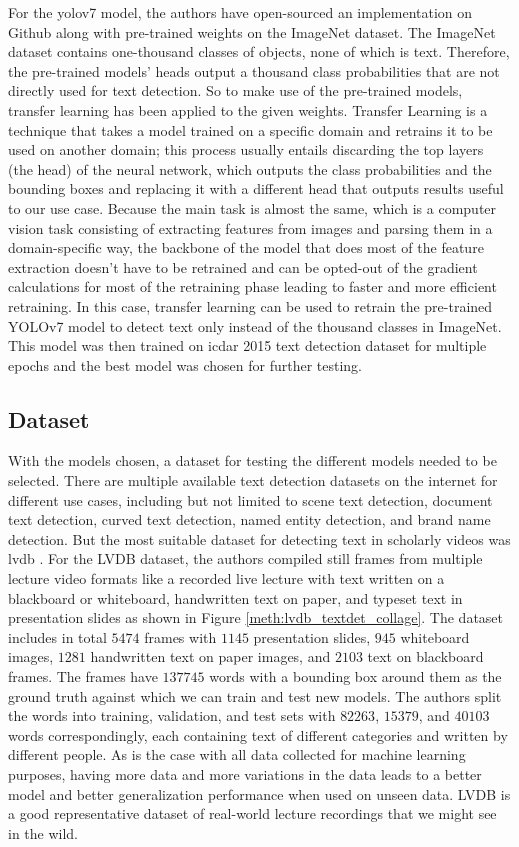 For the \gls{yolov7} model, the authors have open-sourced an implementation on Github\cite{wong_official_2023} along with pre-trained weights on the ImageNet dataset. The ImageNet dataset contains one-thousand classes of objects, none of which is text. Therefore, the pre-trained models' heads output a thousand class probabilities that are not directly used for text detection. So to make use of the pre-trained models, transfer learning has been applied to the given weights. Transfer Learning is a technique that takes a model trained on a specific domain and retrains it to be used on another domain; this process usually entails discarding the top layers (the head) of the neural network, which outputs the class probabilities and the bounding boxes and replacing it with a different head that outputs results useful to our use case. Because the main task is almost the same, which is a computer vision task consisting of extracting features from images and parsing them in a domain-specific way, the backbone of the model that does most of the feature extraction doesn't have to be retrained and can be opted-out of the gradient calculations for most of the retraining phase leading to faster and more efficient retraining. In this case, transfer learning can be used to retrain the pre-trained YOLOv7 model to detect text only instead of the thousand classes in ImageNet. This model was then trained on \gls{icdar} 2015 text detection dataset for multiple epochs and the best model was chosen for further testing.

\subsection{Dataset}

With the models chosen, a dataset for testing the different models needed to be selected. There are multiple available text detection datasets on the internet for different use cases, including but not limited to scene text detection, document text detection, curved text detection, named entity detection, and brand name detection. But the most suitable dataset for detecting text in scholarly videos was \gls{lvdb} \cite{dutta_localizing_2018}. For the LVDB dataset, the authors compiled still frames from multiple lecture video formats like a recorded live lecture with text written on a blackboard or whiteboard, handwritten text on paper, and typeset text in presentation slides as shown in Figure \ref{meth:lvdb_textdet_collage}. The dataset includes in total $5474$ frames with $1145$ presentation slides, $945$ whiteboard images, $1281$ handwritten text on paper images, and $2103$ text on blackboard frames. The frames have $137745$ words with a bounding box around them as the ground truth against which we can train and test new models. The authors split the words into training, validation, and test sets with $82263$, $15379$, and $40103$ words correspondingly, each containing text of different categories and written by different people. As is the case with all data collected for machine learning purposes, having more data and more variations in the data leads to a better model and better generalization performance when used on unseen data. LVDB is a good representative dataset of real-world lecture recordings that we might see in the wild.

